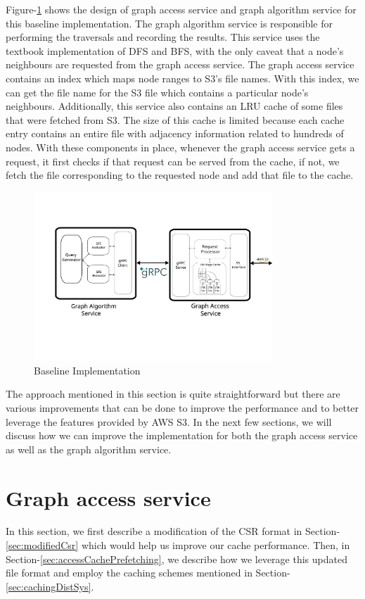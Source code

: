 \medskip
Figure-\ref{fig:baselineImpl} shows the design of graph access service and graph
algorithm service for this baseline implementation. The graph algorithm service
is responsible for performing the traversals and recording the results. This
service uses the textbook implementation of DFS and BFS, with the only caveat
that a node's neighbours are requested from the graph access service. The graph
access service contains an index which maps node ranges to S3's file names. With
this index, we can get the file name for the S3 file which contains a particular
node's neighbours. Additionally, this service also contains an LRU cache of some
files that were fetched from S3. The size of this cache is limited because each
cache entry contains an entire file with adjacency information related to
hundreds of nodes. With these components in place, whenever the graph access
service gets a request, it first checks if that request can be served from the
cache, if not, we fetch the file corresponding to the requested node and add
that file to the cache.
\begin{figure}[ht]
    \centering
    \includegraphics[width=0.8\textwidth]{figures/baseline.png}
    \caption{Baseline Implementation}
    \label{fig:baselineImpl}
\end{figure}

\medskip
The approach mentioned in this section is quite straightforward but there are
various improvements that can be done to improve the performance and to better 
leverage the features provided by AWS S3. In the next few sections, we will
discuss how we can improve the implementation for both the graph access service
as well as the graph algorithm service. 

\section{Graph access service}\label{sec:graphAccess}
In this section, we first describe a modification of the CSR format in
Section-\ref{sec:modifiedCsr} which would help us improve our cache performance.
Then, in Section-\ref{sec:accessCachePrefetching}, we describe how we leverage
this updated file format and employ the caching schemes mentioned in
Section-\ref{sec:cachingDistSys}.

